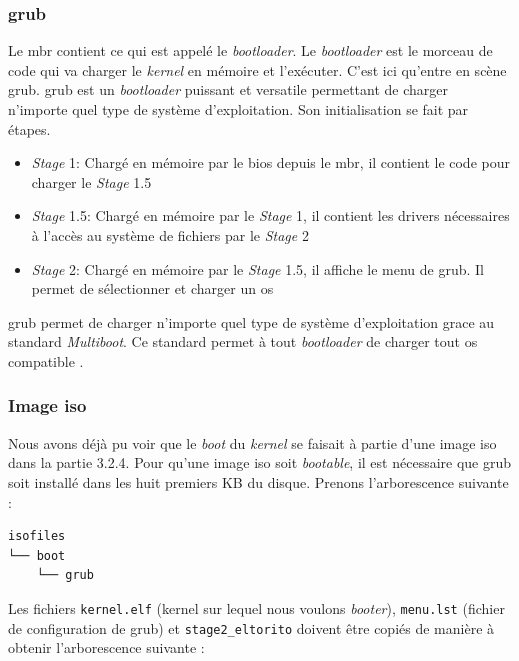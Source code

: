 \documentclass[a4paper, 12pt]{article}
\begin{document}
\subsubsection{\acrshort{grub}}
Le \acrshort{mbr} contient ce qui est appelé le \textit{bootloader}. Le \textit{bootloader}
est le morceau de code qui va charger le \textit{kernel} en mémoire et l'exécuter.
C'est ici qu'entre en scène \acrshort{grub}. \acrshort{grub} est un \textit{bootloader}
puissant et versatile permettant de charger n’importe quel type de système d’exploitation.
Son initialisation se fait par étapes.
\begin{itemize}[label=\textbullet]
	\item \textit{Stage} 1: Chargé en mémoire par le \acrshort{bios} depuis le
    \acrshort{mbr}, il contient le code pour charger le \textit{Stage} 1.5
	\item \textit{Stage} 1.5: Chargé en mémoire par le \textit{Stage} 1, il contient
    les drivers nécessaires à l'accès au système de fichiers par le \textit{Stage} 2
	\item \textit{Stage} 2: Chargé en mémoire par le \textit{Stage} 1.5, il affiche
    le menu de \acrshort{grub}. Il permet de sélectionner et charger un \acrshort{os}
\end{itemize}

\acrshort{grub} permet de charger n'importe quel type de système d'exploitation
grace au standard \textit{Multiboot}. Ce standard permet à tout \textit{bootloader}
de charger tout \acrshort{os} compatible \cite{ref42,ref12}.

\subsubsection{Image \acrshort{iso}}
Nous avons déjà pu voir que le \textit{boot} du \textit{kernel} se faisait à partie
d'une image \acrshort{iso} dans la partie 3.2.4. Pour qu'une image \acrshort{iso}
soit \textit{bootable}, il est nécessaire que \acrshort{grub} soit installé dans
les huit premiers KB du disque. Prenons l'arborescence suivante :

\begin{verbatim}
isofiles
└── boot
    └── grub
\end{verbatim}

Les fichiers \texttt{kernel.elf} (kernel sur lequel nous voulons
\textit{booter}), \texttt{menu.lst} (fichier de configuration de \acrshort{grub})
et \texttt{stage2_eltorito} doivent être copiés de manière à obtenir
l'arborescence suivante :
\end{document}
